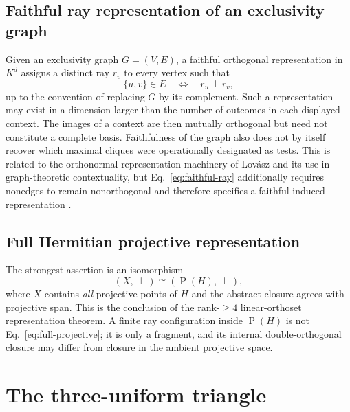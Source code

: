 \documentclass[
  aps,
  pra,
  twocolumn,
  amsmath,
  amssymb,
  longbibliography,
  nofootinbib,
  floatfix
]{revtex4-2}
\newcommand{\Proj}{\operatorname{P}}
\begin{document}
\subsection{Faithful ray representation of an exclusivity graph}

Given an exclusivity graph $G=(V,E)$, a faithful orthogonal representation in
$K^d$ assigns a distinct ray $r_v$ to every vertex such that
\begin{equation}
  \{u,v\}\in E
  \quad\Longleftrightarrow\quad
  r_u\perp r_v,
  \label{eq:faithful-ray}
\end{equation}
up to the convention of replacing $G$ by its complement.  Such a
representation may exist in a dimension larger than the number of outcomes in
each displayed context.  The images of a context are then mutually orthogonal
but need not constitute a complete basis.  Faithfulness of the graph also does
not by itself recover which maximal cliques were operationally designated as
tests.  This is related to the orthonormal-representation machinery of
Lov\'asz and its use in graph-theoretic contextuality, but
Eq.~\eqref{eq:faithful-ray} additionally requires nonedges to remain
nonorthogonal and therefore specifies a faithful induced representation
\cite{lovasz-79,Cabello-2014-gtatqc,
acin-fritz-leverrier-sainz-2015,svozil-2018-b}.

\subsection{Full Hermitian projective representation}

The strongest assertion is an isomorphism
\begin{equation}
  (X,\perp)\cong(\Proj(H),\perp),
  \label{eq:full-projective}
\end{equation}
where $X$ contains \emph{all} projective points of $H$ and the abstract closure
agrees with projective span.  This is the conclusion of the rank-$\ge4$
linear-orthoset representation theorem.  A finite ray configuration inside
$\Proj(H)$ is not Eq.~\eqref{eq:full-projective}; it is only a fragment, and its
internal double-orthogonal closure may differ from closure in the ambient
projective space.

\section{The three-uniform triangle}
\label{sec:triangle}
\end{document}
